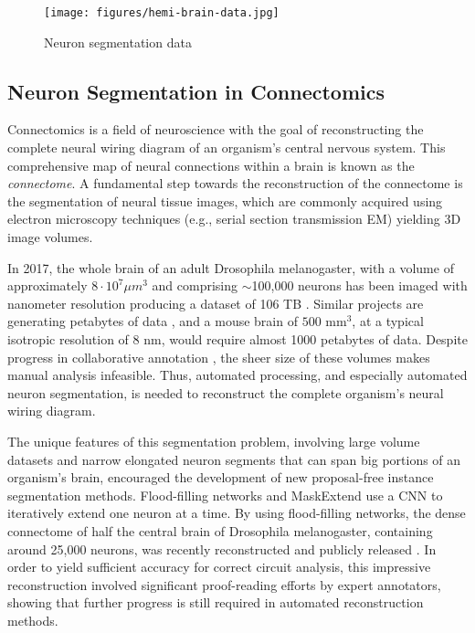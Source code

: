 \begin{figure}[tp]
    \centering
    \texttt{[image: figures/hemi-brain-data.jpg]}%
    \caption{Neuron segmentation data}
    \label{fig:neuron_segmentation_data}
\end{figure}


 
\subsection{Neuron Segmentation in Connectomics}
Connectomics is a field of neuroscience with the goal of reconstructing the complete neural wiring diagram of an organism's central nervous system. This comprehensive map of neural connections within a brain is known as the \emph{connectome}. A fundamental step towards the reconstruction of the connectome is the segmentation of neural tissue images, which are commonly acquired using electron microscopy techniques (e.g., serial section transmission EM) yielding 3D image volumes. 

In 2017, the whole brain of an adult Drosophila melanogaster, with a volume of approximately $8\cdot 10^7 \mu m^3$ and comprising $\sim$100,000 neurons has been imaged with nanometer resolution producing a dataset of 106 TB \cite{zheng2018complete}. Similar projects are generating petabytes of data \cite{yin2020petascale}, and a mouse brain of $500$ mm$^3$, at a typical isotropic resolution of 8 nm, would require almost 1000 petabytes of data.
Despite progress in collaborative annotation \cite{kim2014space}, the sheer size of these volumes makes manual analysis infeasible. Thus, automated processing, and especially automated neuron segmentation, is needed to reconstruct the complete organism's neural wiring diagram.

The unique features of this segmentation problem, involving large volume datasets and narrow elongated neuron segments that can span big portions of an organism's brain, encouraged the development of new proposal-free instance segmentation methods.
Flood-filling networks \cite{januszewski2018high} and MaskExtend \cite{meirovitch2016multi} use a CNN to iteratively extend one neuron at a time. By using flood-filling networks, the dense connectome of half the central brain of Drosophila melanogaster, containing around 25,000 neurons, was recently reconstructed and publicly released \cite{xu2020connectome}. In order to yield sufficient accuracy for correct circuit analysis, this impressive reconstruction involved significant proof-reading efforts by expert annotators, showing that further progress is still required in automated reconstruction methods.

